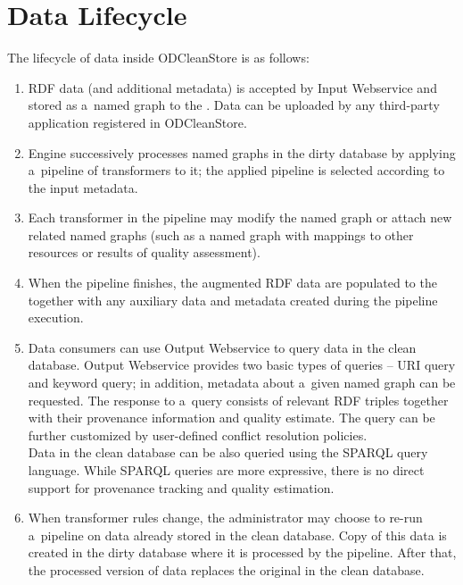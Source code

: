 
\section{Data Lifecycle}

The lifecycle of data inside ODCleanStore is as follows:

\begin{enumerate}
  \item RDF data (and additional metadata) is accepted by Input Webservice and stored as a~named graph to the . Data can be uploaded by any third-party application registered in ODCleanStore.
  \item Engine successively processes named graphs in the dirty database by applying a~pipeline of transformers to it; the applied pipeline is selected according to the input metadata.
  \item Each transformer in the pipeline may modify the named graph or attach new related named graphs (such as a named graph with mappings to other resources or results of quality assessment).
  \item When the pipeline finishes, the augmented RDF data are populated to the  together with any auxiliary data and metadata created during the pipeline execution.
  \item Data consumers can use Output Webservice to query data in the clean database. Output Webservice provides two basic types of queries -- URI query and keyword query; in addition, metadata about a~given named graph can be requested. The response to a~query consists of relevant RDF triples together with their provenance information and quality estimate. The query can be further customized by user-defined conflict resolution policies.\\
	Data in the clean database can be also queried using the SPARQL query language. While SPARQL queries are more expressive, there is no direct support for provenance tracking and quality estimation. 
  \item When transformer rules change, the administrator may choose to re-run a~pipeline on data already stored in the clean database. Copy of this data is created in the dirty database where it is processed by the pipeline. After that, the processed version of data replaces the original in the clean database.
\end{enumerate}

